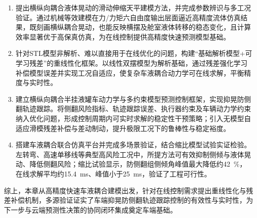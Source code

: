 \begin{enumerate}[label=(\arabic*)]
  \item 提出横纵向耦合液体晃动的滑动伸缩天平建模方法，并完成参数辨识与多工况验证。通过机械等效建模在力/力矩六自由度输出层面逼近高精度流体仿真结果，既刻画横纵耦合晃动，也能反映横摆及舱室液体转移的稳态变化，且计算效率显著优于高保真仿真，为在线控制提供高精度快速预测模型基础。
  
  \item 针对STL模型非解析、难以直接用于在线优化的问题，构建“基础解析模型+可学习残差”的重线性化框架。以线性双摆模型为解析基础，通过残差强化学习补偿模型误差并实现工况自适应，使复杂车液耦合动力学可在线求解，平衡精度与实时性。
  
  \item 建立横纵向耦合半挂液罐车动力学与多约束模型预测控制框架，实现抑晃防侧翻轨迹跟踪。将侧翻风险指标、轨迹跟踪误差、执行器约束及车辆动力学约束纳入优化问题，形成控制周期内可实时求解的稳定性干预策略；引入无模型自适应滑模残差补偿与差动制动，提升极限工况下的鲁棒性与稳定裕度。
  
  \item 搭建车液耦合联合仿真平台并完成多场景验证，结合缩比模型试验实证检验。左转弯、高速单移线等典型高风险工况中，所提方法可有效抑制侧倾与液体晃动、降低侧翻风险；缩比试验显示，防侧翻组侧倾角峰值最大降低约\SI{42}{\percent}，在线求解平均约\SI{15.4}{ms}、峰值小于\SI{25}{ms}，验证了工程可行性。
\end{enumerate}

综上，本章从高精度快速车液耦合建模出发，针对在线控制需求提出重线性化与残差补偿机制，多源验证证实了车端抑晃防侧翻轨迹跟踪控制的有效性与实时性，为下一步与云端预测性决策的协同闭环集成奠定车端基础。
